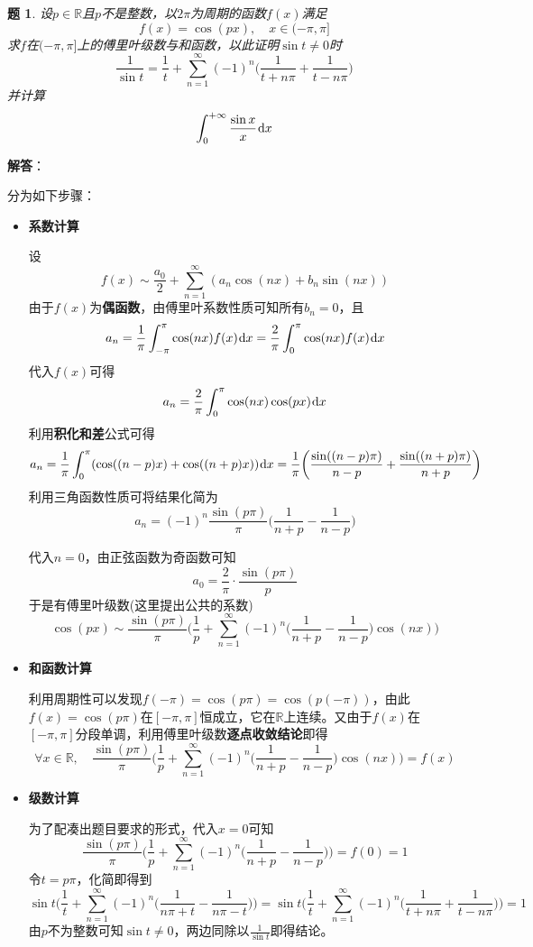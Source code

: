 \documentclass[a4paper,UTF8,fontset=windows,AutoFakeBold]{ctexart}
\newcommand*{\dr}{\hspace{0.07em}\mathrm{d}}
\newcommand*{\rb}{\mathbb{R}}
\newcommand*{\suminf}[1][n=1]{\sum_{#1}^\infty}
\theoremstyle{ex}
\newtheorem{exercise}{题}
\newcommand{\sol}[1]{{\vspace{5pt}\kaishu\noindent\textbf{解答}：\vspace{-3pt}
\begin{compactitem}
    \item[] #1
\end{compactitem}
}}
\begin{document}
\begin{framed}
\begin{exercise}
    设$p\in\rb$且$p$不是整数，以$2\pi$为周期的函数$f(x)$满足
    $$f(x)=\cos(px),\quad x\in(-\pi,\pi]$$
    求$f$在$(-\pi,\pi]$上的傅里叶级数与和函数，以此证明$\sin t\ne0$时
    $$\frac{1}{\sin t}=\frac{1}{t}+\suminf(-1)^n\bigg(\frac{1}{t+n\pi}+\frac{1}{t-n\pi}\bigg)$$
    并计算
    $$\int_0^{+\infty}\frac{\sin x}{x}\dr x$$
\end{exercise}
\sol{
    分为如下步骤：
    \begin{itemize}
        \item \textbf{系数计算}
        
        设
        $$f(x)\sim\frac{a_0}{2}+\suminf(a_n\cos(nx)+b_n\sin(nx))$$
        由于$f(x)$为\textbf{偶函数}，由傅里叶系数性质可知所有$b_n=0$，且
        $$a_n=\frac{1}{\pi}\int_{-\pi}^\pi\cos(nx)f(x)\dr x=\frac{2}{\pi}\int_0^\pi\cos(nx)f(x)\dr x$$
        代入$f(x)$可得
        $$a_n=\frac{2}{\pi}\int_0^\pi\cos(nx)\cos(px)\dr x$$
        利用\textbf{积化和差}公式可得
        $$a_n=\frac{1}{\pi}\int_0^\pi(\cos((n-p)x)+\cos((n+p)x))\dr x=\frac{1}{\pi}\bigg(\frac{\sin((n-p)\pi)}{n-p}+\frac{\sin((n+p)\pi)}{n+p}\bigg)$$
        利用三角函数性质可将结果化简为
        $$a_n=(-1)^n\frac{\sin(p\pi)}{\pi}\bigg(\frac{1}{n+p}-\frac{1}{n-p}\bigg)$$

        代入$n=0$，由正弦函数为奇函数可知
        $$a_0=\frac{2}{\pi}\cdot\frac{\sin(p\pi)}{p}$$
        于是有傅里叶级数(这里提出公共的系数)
        $$\cos(px)\sim\frac{\sin(p\pi)}{\pi}\bigg(\frac{1}{p}+\suminf(-1)^n\bigg(\frac{1}{n+p}-\frac{1}{n-p}\bigg)\cos(nx)\bigg)$$

        \item \textbf{和函数计算}
        
        利用周期性可以发现$f(-\pi)=\cos(p\pi)=\cos(p(-\pi))$，由此$f(x)=\cos(p\pi)$在$[-\pi,\pi]$恒成立，它在$\rb$上连续。又由于$f(x)$在$[-\pi,\pi]$分段单调，利用傅里叶级数\textbf{逐点收敛结论}即得
        $$\forall x\in\rb,\quad\frac{\sin(p\pi)}{\pi}\bigg(\frac{1}{p}+\suminf(-1)^n\bigg(\frac{1}{n+p}-\frac{1}{n-p}\bigg)\cos(nx)\bigg)=f(x)$$

        \item \textbf{级数计算}
        
        为了配凑出题目要求的形式，代入$x=0$可知
        $$\frac{\sin(p\pi)}{\pi}\bigg(\frac{1}{p}+\suminf(-1)^n\bigg(\frac{1}{n+p}-\frac{1}{n-p}\bigg)\bigg)=f(0)=1$$
        令$t=p\pi$，化简即得到
        $$\sin t\bigg(\frac{1}{t}+\suminf(-1)^n\bigg(\frac{1}{n\pi+t}-\frac{1}{n\pi-t}\bigg)\bigg)=\sin t\bigg(\frac{1}{t}+\suminf(-1)^n\bigg(\frac{1}{t+n\pi}+\frac{1}{t-n\pi}\bigg)\bigg)=1$$
        由$p$不为整数可知$\sin t\ne0$，两边同除以$\frac{1}{\sin t}$即得结论。


\end{itemize}}
\end{framed}
\end{document}
